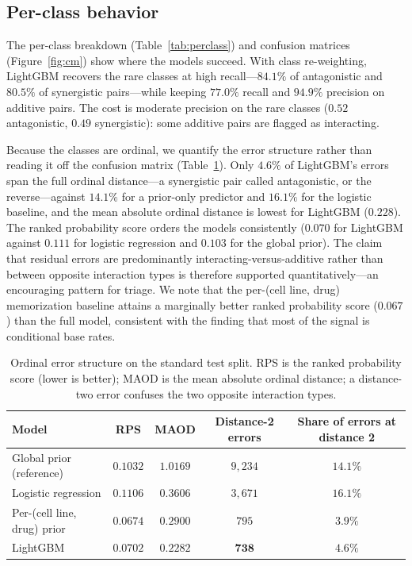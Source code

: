 \documentclass[11pt]{article}
\begin{document}
\subsection{Per-class behavior}
The per-class breakdown (Table~\ref{tab:perclass}) and confusion matrices (Figure~\ref{fig:cm}) show
where the models succeed. With class re-weighting, LightGBM recovers the rare classes at high
recall---$84.1\%$ of antagonistic and $80.5\%$ of synergistic pairs---while keeping $77.0\%$ recall and
$94.9\%$ precision on additive pairs. The cost is moderate precision on the rare classes
($0.52$ antagonistic, $0.49$ synergistic): some additive pairs are flagged as interacting.

Because the classes are ordinal, we quantify the error structure rather than reading it off the
confusion matrix (Table~\ref{tab:ordinal}). Only $4.6\%$ of LightGBM's errors span the full ordinal
distance---a synergistic pair called antagonistic, or the reverse---against $14.1\%$ for a prior-only
predictor and $16.1\%$ for the logistic baseline, and the mean absolute ordinal distance is lowest for
LightGBM ($0.228$). The ranked probability score orders the models consistently ($0.070$ for LightGBM
against $0.111$ for logistic regression and $0.103$ for the global prior). The claim that residual
errors are predominantly interacting-versus-additive rather than between opposite interaction types is
therefore supported quantitatively---an encouraging pattern for triage. We note that the
per-(cell line, drug) memorization baseline attains a marginally better ranked probability score
($0.067$) than the full model, consistent with the finding that most of the signal is conditional base
rates.

\begin{table}[H]
\centering
\caption{Ordinal error structure on the standard test split. RPS is the ranked probability score
(lower is better); MAOD is the mean absolute ordinal distance; a distance-two error confuses the two
opposite interaction types.}
\label{tab:ordinal}
\small
\begin{tabular}{lcccc}
\toprule
Model & RPS & MAOD & Distance-2 errors & Share of errors at distance 2 \\
\midrule
Global prior (reference)      & $0.1032$ & $1.0169$ & $9{,}234$ & $14.1\%$ \\
Logistic regression           & $0.1106$ & $0.3606$ & $3{,}671$ & $16.1\%$ \\
Per-(cell line, drug) prior   & $\mathbf{0.0674}$ & $0.2900$ & $795$ & $\mathbf{3.9\%}$ \\
LightGBM                      & $0.0702$ & $\mathbf{0.2282}$ & $\mathbf{738}$ & $4.6\%$ \\
\bottomrule
\end{tabular}
\end{table}
\end{document}
